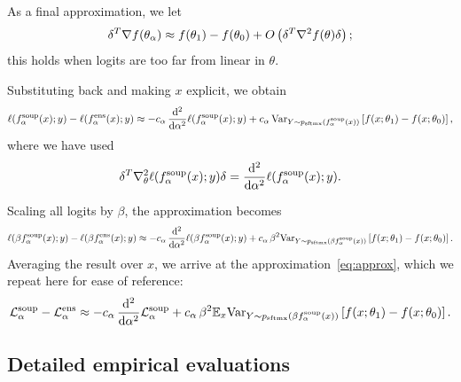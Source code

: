 As a final approximation, we let
\begin{equation*}
	\delta^T \nabla f(\theta_\alpha) \approx f(\theta_1) - f(\theta_0) 
	+
	O\left( \delta^{T}\nabla^{2} f(\theta)\delta \right);
\end{equation*}
this holds when logits are too far from linear in $\theta$. 

Substituting back and making $x$ explicit, we obtain
\begin{equation*}
	\ell(f_\alpha^{\mathrm{soup}}(x);y) - \ell(f_\alpha^{\mathrm{ens}}(x);y) \approx
	 -c_\alpha\, \frac{\mathrm{d}^2}{\mathrm{d}\alpha^2} \ell( f_\alpha^{\mathrm{soup}}(x); y)
	 +c_\alpha\, \mathrm{Var}_{Y\sim p_\mathrm{sftmx}(f_\alpha^{\mathrm{soup}}(x))} \left[ f(x;\theta_1) - f(x;\theta_0) \right],
\end{equation*}
where we have used
\begin{equation*}
	\delta^T  \nabla^{2}_\theta \ell( f_\alpha^{\mathrm{soup}}(x); y) \delta = \frac{\mathrm{d}^2}{\mathrm{d}\alpha^2} \ell( f_\alpha^{\mathrm{soup}}(x); y). 
\end{equation*}

Scaling all logits by $\beta$, the approximation becomes
\begin{equation*}
	\ell(\beta f_\alpha^{\mathrm{soup}}(x);y) - \ell(\beta f_\alpha^{\mathrm{ens}}(x);y) \approx
	-c_\alpha\, \frac{\mathrm{d}^2}{\mathrm{d}\alpha^2} \ell( \beta f_\alpha^{\mathrm{soup}}(x); y)
	+c_\alpha\, \beta^2\mathrm{Var}_{Y\sim p_\mathrm{sftmx}(\beta f_\alpha^{\mathrm{soup}}(x))} \left[ f(x;\theta_1) - f(x;\theta_0) \right].
\end{equation*}
Averaging the result over $x$, we arrive at the approximation~\eqref{eq:approx}, which we repeat here for ease of reference:
\begin{equation*}
	\mathcal{L}^{\mathrm{soup}}_\alpha - \mathcal{L}^{\mathrm{ens}}_\alpha \approx
	-c_\alpha\, \frac{\mathrm{d}^2}{\mathrm{d}\alpha^2} \mathcal{L}^{\mathrm{soup}}_\alpha
	+c_\alpha\, \beta^2 \mathbb{E}_x \mathrm{Var}_{Y\sim p_\mathrm{sftmx}(\beta f_\alpha^{\mathrm{soup}}(x))} \left[ f(x;\theta_1) - f(x;\theta_0) \right].
\end{equation*}

\subsection{Detailed empirical evaluations}\label{app:theory-eval}

